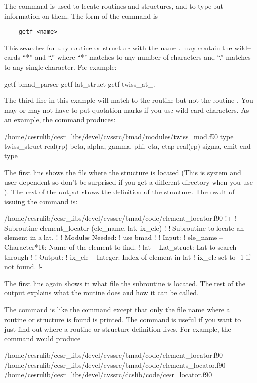The  command is used to locate routines and structures, and
to type out information on them.  The form of the command is
\begin{verbatim}
    getf <name>
\end{verbatim}
This searches for any routine or structure with the name
.  may contain the wild--cards ``*'' and ``.'' where
``*'' matches to any number of characters and ``.'' matches to any
single character. For example:
\begin{example}
    getf bmad_parser
    getf lat_struct
    getf twiss_at_.
\end{example}
The third line in this example will match to the routine
 but not the routine . You may or
may not have to put quotation marks if you use wild card characters.
As an example, the command  produces:
\begin{example}
  /home/cesrulib/cesr_libs/devel/cvssrc/bmad/modules/twiss_mod.f90
    type twiss_struct
      real(rp) beta, alpha, gamma, phi, eta, etap
      real(rp) sigma, emit
    end type
\end{example}
The first line shows the file where the structure is located (This is
system and user dependent so don't be surprised if you get a different
directory when you use ). The rest of the output shows the
definition of the  structure.  The result of issuing
the command  is:
\begin{example}
  /home/cesrulib/cesr_libs/devel/cvssrc/bmad/code/element_locator.f90
  !+
  ! Subroutine element_locator (ele_name, lat, ix_ele)
  !
  ! Subroutine to locate an element in a lat. 
  !
  ! Modules Needed:
  !   use bmad
  !
  ! Input:
  !   ele_name -- Character*16: Name of the element to find.
  !   lat     -- Lat_struct: Lat to search through
  !
  ! Output:
  !   ix_ele -- Integer: Index of element in lat%
  !               ix_ele set to -1 if not found.
  !-
\end{example}
The first line again shows in what file the subroutine is located.
The rest of the output explains what the routine does and how it
can be called.

The  command is like the  command except that only
the file name where a routine or structure is found is printed.
The  command is useful if you
want to just find out where a routine or structure definition lives.
For example, the  command would produce
\begin{example}
  /home/cesrulib/cesr_libs/devel/cvssrc/bmad/code/element_locator.f90
  /home/cesrulib/cesr_libs/devel/cvssrc/bmad/code/elements_locator.f90
  /home/cesrulib/cesr_libs/devel/cvssrc/dcslib/code/cesr_locator.f90
\end{example}

